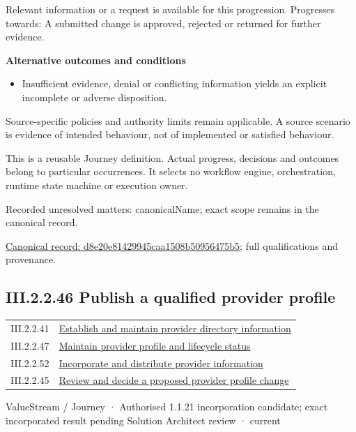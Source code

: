 Relevant information or a request is available for this progression. Progresses towards: A submitted change is approved, rejected or returned for further evidence.



\par\medskip\textbf{Alternative outcomes and conditions}\par


\begin{itemize}


\item Insufficient evidence, denial or conflicting information yields an explicit incomplete or adverse disposition.

\end{itemize}


Source-specific policies and authority limits remain applicable. A source scenario is evidence of intended behaviour, not of implemented or satisfied behaviour.



This is a reusable Journey definition. Actual progress, decisions and outcomes belong to particular occurrences. It selects no workflow engine, orchestration, runtime state machine or execution owner.


{\small Recorded unresolved matters: canonicalName; exact scope remains in the canonical record.}\par
{\footnotesize \href{../../../../../../../continuum/strategy/value-stream/d8e20e81429945caa1508b50956475b5.md}{Canonical record: d8e20e81429945caa1508b50956475b5}; full qualifications and provenance.}\par
\subsection*{III.2.2.46 Publish a qualified provider profile}
\label{navigation:III.2.2.46}

\begin{longtable}{p{.22\linewidth}p{.73\linewidth}}
III.2.2.41 & \hyperref[element:679b0055ee5d42d4a838e35edd3de01f]{Establish and maintain provider directory information} \\
III.2.2.47 & \hyperref[element:79cb51c0f6184273af18b5e0bac64720]{Maintain provider profile and lifecycle status} \\
III.2.2.52 & \hyperref[element:9eb9f3210d5e4b46ac21463f54e62ab9]{Incorporate and distribute provider information} \\
III.2.2.45 & \hyperref[element:d8e20e81429945caa1508b50956475b5]{Review and decide a proposed provider profile change} \\
\end{longtable}
\label{element:4522e0c4204e4c0c93d2b1f9ef3887ad}
{\small ValueStream / Journey · Authorised 1.1.21 incorporation candidate; exact incorporated result pending Solution Architect review · current}\par

